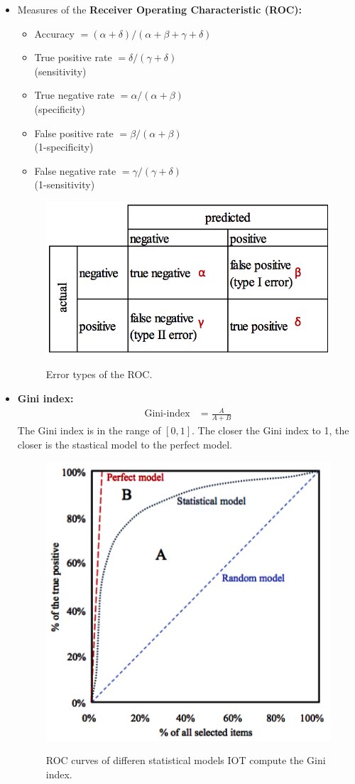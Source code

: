 \documentclass[a4paper, landscape, 6pt, fleqn]{scrartcl}
\renewcommand{\emph}[1]{\textbf{#1}}
\begin{document}
\begin{multicols*}{4}
\begin{itemize}
\item Measures of the \emph{Receiver Operating Characteristic (ROC):}
\begin{itemize}
\item Accuracy $= (\alpha+\delta)/(\alpha+\beta+\gamma+\delta)$
\item True positive rate $=\delta/(\gamma+\delta)$ \\
(sensitivity)
\item True negative rate $=\alpha/(\alpha+\beta)$ \\
(specificity)
\item False positive rate $=\beta/(\alpha+\beta)$ \\
(1-specificity)
\item False negative rate $=\gamma/(\gamma+\delta)$ \\
(1-sensitivity)
\end{itemize}
\begin{figure}[H]
\centering
\includegraphics[width=0.8 \linewidth]{ROCTable}
\label{fig:ROCTable}
\caption{Error types of the ROC.}
\end{figure}
\item \emph{Gini index:}
\begin{align*}
\text{Gini-index} &= \frac{A}{A+B}
\end{align*}
The Gini index is in the range of $[0,1]$. The closer the Gini index to 1, the closer is the stastical model to the perfect model.
\begin{figure}[H]
\centering
\includegraphics[width=0.7 \linewidth]{ROCCurve}
\label{fig:ROCCurve}
\caption{ROC curves of differen statistical models IOT compute the Gini index.}
\end{figure}
\end{itemize}


\end{multicols*}
\end{document}
